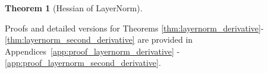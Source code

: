 \documentclass{article}
\newtheorem{theorem}{Theorem} %
\begin{document}
\begin{theorem} [Hessian of LayerNorm]


\end{theorem}

Proofs and detailed versions for Theorems \ref{thm:layernorm_derivative}-\ref{thm:layernorm_second_derivative} are provided in Appendices~\ref{app:proof_layernorm_derivative} - \ref{app:proof_layernorm_second_derivative}.

\end{document}
